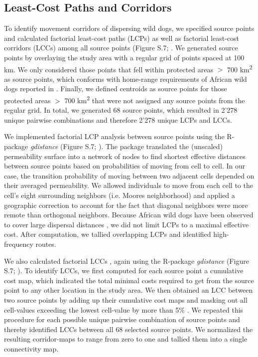 \documentclass[abstract=on,10pt,a4paper,bibliography=totocnumbered]{article}
\begin{document}
\subsection{Least-Cost Paths and Corridors}
To identify movement corridors of dispersing wild dogs, we specified source
points and calculated factorial least-cost paths (LCPs) as well as factorial
least-cost corridors (LCCs) among all source points (Figure S.7;
\citealp{Adriaensen.2003, Sawyer.2011, Elliot.2014}. We generated source points
by overlaying the study area with a regular grid of points spaced at 100 km. We
only considered those points that fell within protected areas \(>\) 700
km\textsuperscript{2} as source points, which conforms with home-range
requirements of African wild dogs reported in \cite{Pomilia.2015}. Finally, we
defined centroids as source points for those protected areas \(>\) 700
km\textsuperscript{2} that were not assigned any source points from the regular
grid. In total, we generated 68 source points, which resulted in 2'278 unique
pairwise combinations and therefore 2'278 unique LCPs and LCCs.

We implemented factorial LCP analysis between source points using the R-package
\textit{gdistance} (Figure S.7; \citealp{vanEtten.2017}). The package translated
the (unscaled) permeability surface into a network of nodes to find shortest
effective distances between source points based on probabilities of moving from
cell to cell. In our case, the transition probability of moving between two
adjacent cells depended on their averaged permeability. We allowed individuals
to move from each cell to the cell's eight surrounding neighbors (i.e. Moores
neighborhood) and applied a geographic correction to account for the fact that
diagonal neighbors were more remote than orthogonal neighbors. Because African
wild dogs have been observed to cover large dispersal distances
\citep{DaviesMostert.2012, Masenga.2016, Cozzi.2020}, we did not limit LCPs to a
maximal effective cost. After computation, we tallied overlapping LCPs and
identified high-frequency routes.

We also calculated factorial LCCs \citep{Pinto.2009, Sawyer.2011, Elliot.2014},
again using the R-package \textit{gdistance} (Figure S.7;
\citealp{vanEtten.2017}). To identify LCCs, we first computed for each source
point a cumulative cost map, which indicated the total minimal costs required to
get from the source point to any other location in the study area. We then
obtained an LCC between two source points by adding up their cumulative cost
maps and masking out all cell-values exceeding the lowest cell-value by more
than 5\% \citep{Pinto.2009}. We repeated this procedure for each possible unique
pairwise combination of source points and thereby identified LCCs between all 68
selected source points. We normalized the resulting corridor-maps to range from
zero to one and tallied them into a single connectivity map.
\end{document}
